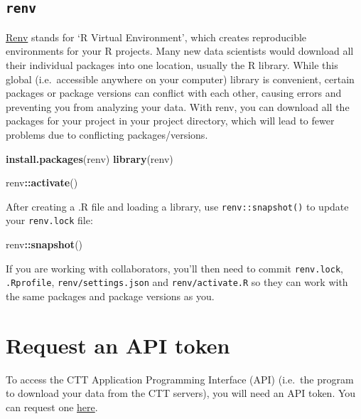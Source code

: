 \documentclass[
]{book}
\newenvironment{Shaded}{\begin{snugshade}}{\end{snugshade}}
\newcommand{\FunctionTok}[1]{\textcolor[rgb]{0.13,0.29,0.53}{\textbf{#1}}}
\newcommand{\NormalTok}[1]{#1}
\newcommand{\SpecialCharTok}[1]{\textcolor[rgb]{0.81,0.36,0.00}{\textbf{#1}}}
\newcommand{\StringTok}[1]{\textcolor[rgb]{0.31,0.60,0.02}{#1}}
\begin{document}
\subsection{\texorpdfstring{\texttt{renv}}{renv}}\label{renv}

\href{https://rstudio.github.io/renv/articles/renv.html}{Renv} stands for `R Virtual Environment', which creates reproducible environments for your R projects. Many new data scientists would download all their individual packages into one location, usually the R library. While this global (i.e.~accessible anywhere on your computer) library is convenient, certain packages or package versions can conflict with each other, causing errors and preventing you from analyzing your data. With renv, you can download all the packages for your project in your project directory, which will lead to fewer problems due to conflicting packages/versions.

\begin{Shaded}
\begin{Highlighting}[]
\FunctionTok{install.packages}\NormalTok{(}\StringTok{\textquotesingle{}renv\textquotesingle{}}\NormalTok{)}
\FunctionTok{library}\NormalTok{(renv)}

\NormalTok{renv}\SpecialCharTok{::}\FunctionTok{activate}\NormalTok{()}
\end{Highlighting}
\end{Shaded}

After creating a .R file and loading a library, use \texttt{renv::snapshot()} to update your \texttt{renv.lock} file:

\begin{Shaded}
\begin{Highlighting}[]
\NormalTok{renv}\SpecialCharTok{::}\FunctionTok{snapshot}\NormalTok{()}
\end{Highlighting}
\end{Shaded}

If you are working with collaborators, you'll then need to commit \texttt{renv.lock}, \texttt{.Rprofile}, \texttt{renv/settings.json} and \texttt{renv/activate.R} so they can work with the same packages and package versions as you.

\section{Request an API token}\label{request-an-api-token}

To access the CTT Application Programming Interface (API) (i.e.~the program to download your data from the CTT servers), you will need an API token. You can request one \href{https://celltracktech.com/pages/csd-radio-api-key-request}{here}.
\end{document}
